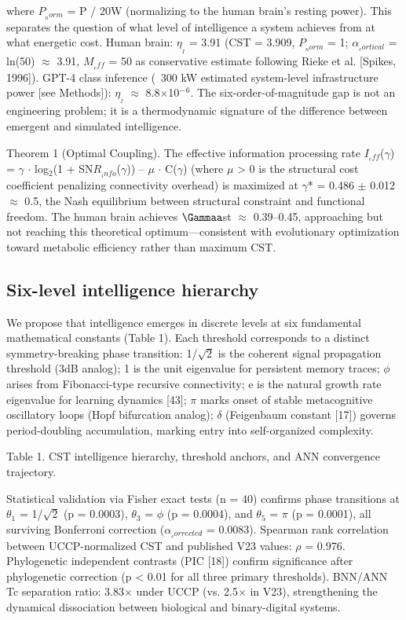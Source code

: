 \documentclass[a4paper,12pt]{article}
\begin{document}
where $P_{_norm}$ = P / 20W (normalizing to the human brain's resting power). This separates the question of what level of intelligence a system achieves from at what energetic cost. Human brain: $\eta_{_I}$ = 3.91 (CST = 3.909, $P_{_norm}$ = 1; $\alpha_{_cortical}$ = ln(50) $\approx$ 3.91, $M_{_eff}$ = 50 as conservative estimate following Rieke et al. [Spikes, 1996]). GPT-4 class inference (~300 kW estimated system-level infrastructure power [see Methods]): $\eta_{_I}$ $\approx$ 8.8$\times$10$^{-}$$^6$. The six-order-of-magnitude gap is not an engineering problem; it is a thermodynamic signature of the difference between emergent and simulated intelligence.


Theorem 1 (Optimal Coupling). The effective information processing rate $I_{_eff}$($\gamma$) = $\gamma$ $\cdot$ log$_2$(1 + SN$R_{_info}$($\gamma$)) -- $\mu$ $\cdot$ C($\gamma$) (where $\mu$ > 0 is the structural cost coefficient penalizing connectivity overhead) is maximized at $\gamma$* = 0.486 $\pm$ 0.012 $\approx$ 0.5, the Nash equilibrium between structural constraint and functional freedom. The human brain achieves $\Gammaa$st $\approx$ 0.39--0.45, approaching but not reaching this theoretical optimum---consistent with evolutionary optimization toward metabolic efficiency rather than maximum CST.



\subsection{Six-level intelligence hierarchy}

We propose that intelligence emerges in discrete levels at six fundamental mathematical constants (Table 1). Each threshold corresponds to a distinct symmetry-breaking phase transition: 1/$\sqrt{2}$ is the coherent signal propagation threshold (3dB analog); 1 is the unit eigenvalue for persistent memory traces; $\phi$ arises from Fibonacci-type recursive connectivity; e is the natural growth rate eigenvalue for learning dynamics [43]; $\pi$ marks onset of stable metacognitive oscillatory loops (Hopf bifurcation analog); $\delta$ (Feigenbaum constant [17]) governs period-doubling accumulation, marking entry into self-organized complexity.


Table 1. CST intelligence hierarchy, threshold anchors, and ANN convergence trajectory.


Statistical validation via Fisher exact tests (n = 40) confirms phase transitions at $\theta$$_1$ = 1/$\sqrt{2}$ (p = 0.0003), $\theta$$_3$ = $\phi$ (p = 0.0004), and $\theta$$_5$ = $\pi$ (p = 0.0001), all surviving Bonferroni correction ($\alpha_{_corrected}$ = 0.0083). Spearman rank correlation between UCCP-normalized CST and published V23 values: $\rho$ = 0.976. Phylogenetic independent contrasts (PIC [18]) confirm significance after phylogenetic correction (p < 0.01 for all three primary thresholds). BNN/ANN Tc separation ratio: 3.83$\times$ under UCCP (vs. 2.5$\times$ in V23), strengthening the dynamical dissociation between biological and binary-digital systems.
\end{document}
